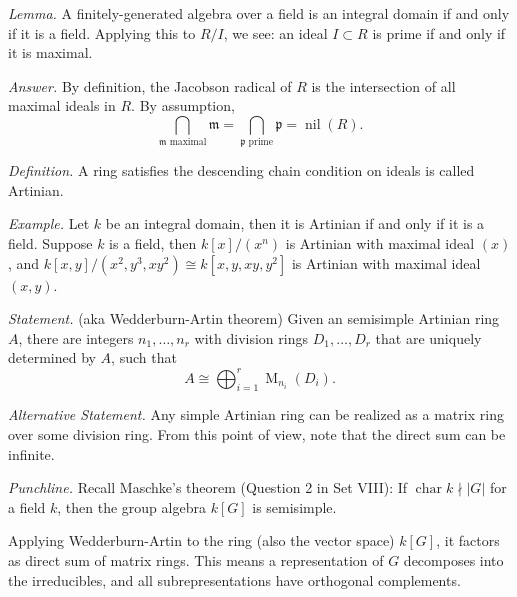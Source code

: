 \documentclass{mathproblems}
\begin{document}
\begin{questions}

{\color{violet}
\textit{Lemma.} A finitely-generated algebra over a field is an integral domain if and only if it is a field. Applying this to $R/I$, we see: an ideal $I\subset R$ is prime if and only if it is maximal.
}

\textit{Answer.} By definition, the Jacobson radical of $R$ is the intersection of all maximal ideals in $R$. By assumption,
$$
\bigcap_{\mathfrak{m}\text{ maximal}}\mathfrak{m}=\bigcap_{\mathfrak{p}\text{ prime}}\mathfrak{p}=\operatorname{nil}(R).
$$



\textit{Definition.} A ring satisfies the descending chain condition on ideals is called Artinian.

\textit{Example.} Let $k$ be an integral domain, then it is Artinian if and only if it is a field. Suppose $k$ is a field, then $k[x]/(x^n)$ is Artinian with maximal ideal $(x)$, and $k[x,y]/(x^2,y^3,xy^2)\cong k[x,y,xy,y^2]$ is Artinian with maximal ideal $(x,y)$.


\textit{Statement.} (aka Wedderburn-Artin theorem) Given an semisimple Artinian ring $A$, there are integers $n_1,\ldots,n_r$ with division rings $D_1,\ldots,D_r$ that are uniquely determined by $A$, such that
$$
A\cong \bigoplus_{i=1}^r \operatorname{M}_{n_i}(D_i).
$$

\textit{Alternative Statement.} Any simple Artinian ring can be realized as a matrix ring over some division ring. From this point of view, note that the direct sum can be infinite.

{\color{violet}
\textit{Punchline.} Recall Maschke's theorem (Question 2 in Set VIII): If $\operatorname{char}k\nmid |G|$ for a field $k$, then the group algebra $k[G]$ is semisimple.

Applying Wedderburn-Artin to the ring (also the vector space) $k[G]$, it factors as direct sum of matrix rings. This means a representation of $G$ decomposes into the irreducibles, and all subrepresentations have orthogonal complements.
}



\end{questions}
\end{document}
